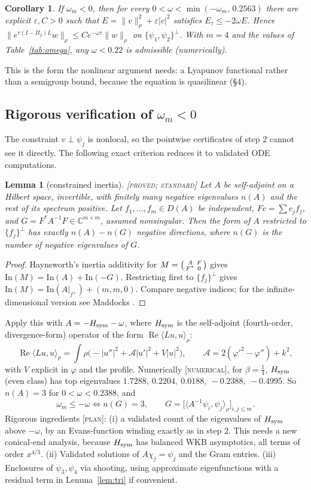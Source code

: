 \documentclass[11pt]{amsart}
\newtheorem{lemma}[theorem]{Lemma}
\newtheorem{corollary}[theorem]{Corollary}
\theoremstyle{remark}
\newcommand{\C}{\mathbb{C}}
\newcommand{\eps}{\varepsilon}
\newcommand{\ip}[2]{\langle #1,#2\rangle}
\newcommand{\re}{\operatorname{Re}}
\newcommand{\lab}[1]{\textup{\textsc{[#1]}}}
\begin{document}
\begin{corollary}\label{cor:decay}
If $\omega_m<0$, then for every $0<\omega<\min(-\omega_m,\,0.2563)$ there are explicit $\eps,C>0$ such that $E=\|v\|_\rho^2+\eps|c|^2$ satisfies $E_\tau\le-2\omega E$. Hence $\|e^{\tau(I-\Pi_2)L}w\|_\rho\le Ce^{-\omega\tau}\|w\|_\rho$ on $\{\psi_1,\psi_2\}^\perp$. With $m=4$ and the values of Table~\ref{tab:omega}, any $\omega<0.22$ is admissible (numerically).
\end{corollary}
This is the form the nonlinear argument needs: a Lyapunov functional rather than a semigroup bound, because the equation is quasilinear (\S4).

\subsection*{Rigorous verification of $\omega_m<0$}
The constraint $v\perp\psi_j$ is nonlocal, so the pointwise certificates of step 2 cannot see it directly. The following exact criterion reduces it to validated ODE computations.

\begin{lemma}[constrained inertia]\label{lem:inertia}\lab{proved; standard}
Let $A$ be self-adjoint on a Hilbert space, invertible, with finitely many negative eigenvalues $n(A)$ and the rest of its spectrum positive. Let $f_1,\dots,f_m\in D(A)$ be independent, $F c=\sum c_jf_j$, and $G=F^*A^{-1}F\in\C^{m\times m}$, assumed nonsingular. Then the form of $A$ restricted to $\{f_j\}^\perp$ has exactly $n(A)-n(G)$ negative directions, where $n(G)$ is the number of negative eigenvalues of $G$.
\end{lemma}
\begin{proof}
Haynsworth's inertia additivity for $M=\begin{psmallmatrix}A&F\\F^*&0\end{psmallmatrix}$ gives $\mathrm{In}(M)=\mathrm{In}(A)+\mathrm{In}(-G)$. Restricting first to $\{f_j\}^\perp$ gives $\mathrm{In}(M)=\mathrm{In}(A|_{f^\perp})+(m,m,0)$. Compare negative indices; for the infinite-dimensional version see Maddocks \cite{Ma88}.
\end{proof}
Apply this with $A=-H_{\rm sym}-\omega$, where $H_{\rm sym}$ is the self-adjoint (fourth-order, divergence-form) operator of the form $\re\ip{Lu}{u}_\rho$:
\[
\re\ip{Lu}{u}_\rho=\int\rho\big(-|u''|^2+\mathcal A|u'|^2+V|u|^2\big),\qquad \mathcal A=2(\varphi'^2-\varphi'')+k^2,
\]
with $V$ explicit in $\varphi$ and the profile. Numerically \lab{numerical}, for $\beta=\frac14$, $H_{\rm sym}$ (even class) has top eigenvalues $1.7288,\ 0.2204,\ 0.0188,\ -0.2388,\ -0.4995$. So $n(A)=3$ for $0<\omega<0.2388$, and
\[
\omega_m\le-\omega\iff n(G)=3,\qquad G=\big[\ip{A^{-1}\psi_i}{\psi_j}_\rho\big]_{i,j\le m}.
\]
Rigorous ingredients \lab{plan}: (i) a validated count of the eigenvalues of $H_{\rm sym}$ above $-\omega$, by an Evans-function winding exactly as in step 2. This needs a new conical-end analysis, because $H_{\rm sym}$ has balanced WKB asymptotics, all terms of order $x^{4/3}$. (ii) Validated solutions of $A\chi_j=\psi_j$ and the Gram entries. (iii) Enclosures of $\psi_3,\psi_4$ via shooting, using approximate eigenfunctions with a residual term in Lemma~\ref{lem:tri} if convenient.
\end{document}
